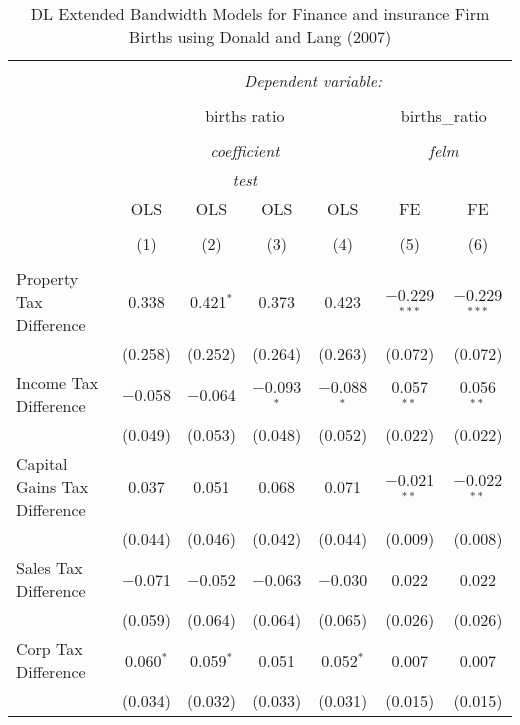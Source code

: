 
\begin{table}[!htbp] \centering 
  \caption{DL Extended Bandwidth Models for  Finance and insurance Firm Births using Donald and Lang (2007)} 
  \label{} 
\begin{tabular}{@{\extracolsep{5pt}}lcccccc} 
\\[-1.8ex]\hline 
\hline \\[-1.8ex] 
 & \multicolumn{6}{c}{\textit{Dependent variable:}} \\ 
\cline{2-7} 
\\[-1.8ex] & \multicolumn{4}{c}{births ratio} & \multicolumn{2}{c}{births\_ratio} \\ 
\\[-1.8ex] & \multicolumn{4}{c}{\textit{coefficient}} & \multicolumn{2}{c}{\textit{felm}} \\ 
 & \multicolumn{4}{c}{\textit{test}} & \multicolumn{2}{c}{\textit{}} \\ 
 & OLS & OLS & OLS & OLS & FE & FE \\ 
\\[-1.8ex] & (1) & (2) & (3) & (4) & (5) & (6)\\ 
\hline \\[-1.8ex] 
 Property Tax Difference & 0.338 & 0.421$^{*}$ & 0.373 & 0.423 & $-$0.229$^{***}$ & $-$0.229$^{***}$ \\ 
  & (0.258) & (0.252) & (0.264) & (0.263) & (0.072) & (0.072) \\ 
  Income Tax Difference & $-$0.058 & $-$0.064 & $-$0.093$^{*}$ & $-$0.088$^{*}$ & 0.057$^{**}$ & 0.056$^{**}$ \\ 
  & (0.049) & (0.053) & (0.048) & (0.052) & (0.022) & (0.022) \\ 
  Capital Gains Tax Difference & 0.037 & 0.051 & 0.068 & 0.071 & $-$0.021$^{**}$ & $-$0.022$^{**}$ \\ 
  & (0.044) & (0.046) & (0.042) & (0.044) & (0.009) & (0.008) \\ 
  Sales Tax Difference & $-$0.071 & $-$0.052 & $-$0.063 & $-$0.030 & 0.022 & 0.022 \\ 
  & (0.059) & (0.064) & (0.064) & (0.065) & (0.026) & (0.026) \\ 
  Corp Tax Difference & 0.060$^{*}$ & 0.059$^{*}$ & 0.051 & 0.052$^{*}$ & 0.007 & 0.007 \\ 
  & (0.034) & (0.032) & (0.033) & (0.031) & (0.015) & (0.015) \\ 

\end{tabular}
\end{table}
